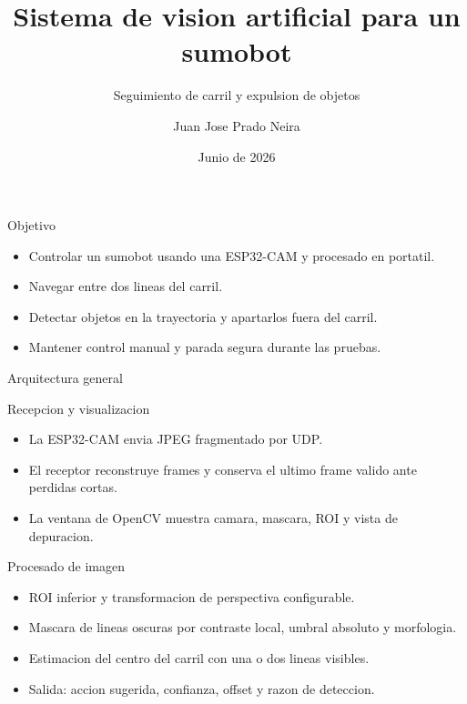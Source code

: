 \documentclass[aspectratio=169]{beamer}
\title{Sistema de vision artificial para un sumobot}
\subtitle{Seguimiento de carril y expulsion de objetos}
\author{Juan Jose Prado Neira}
\date{Junio de 2026}
\begin{document}
\begin{frame}
  \titlepage
\end{frame}

\begin{frame}{Objetivo}
  \begin{itemize}
    \item Controlar un sumobot usando una ESP32-CAM y procesado en portatil.
    \item Navegar entre dos lineas del carril.
    \item Detectar objetos en la trayectoria y apartarlos fuera del carril.
    \item Mantener control manual y parada segura durante las pruebas.
  \end{itemize}
\end{frame}

\begin{frame}{Arquitectura general}
  \centering
\end{frame}

\begin{frame}{Recepcion y visualizacion}
  \begin{itemize}
    \item La ESP32-CAM envia JPEG fragmentado por UDP.
    \item El receptor reconstruye frames y conserva el ultimo frame valido ante perdidas cortas.
    \item La ventana de OpenCV muestra camara, mascara, ROI y vista de depuracion.
  \end{itemize}
\end{frame}

\begin{frame}{Procesado de imagen}
  \begin{itemize}
    \item ROI inferior y transformacion de perspectiva configurable.
    \item Mascara de lineas oscuras por contraste local, umbral absoluto y morfologia.
    \item Estimacion del centro del carril con una o dos lineas visibles.
    \item Salida: accion sugerida, confianza, offset y razon de deteccion.
  \end{itemize}
\end{frame}
\end{document}
